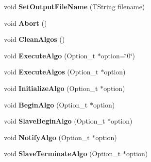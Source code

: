 \begin{DoxyCompactItemize}
\item 
\hypertarget{class_h_a_l_1_1_algorithm_ae30243bd1c0691a003d33ba6b02518cc}{void {\bfseries Set\+Output\+File\+Name} (T\+String filename)}\label{class_h_a_l_1_1_algorithm_ae30243bd1c0691a003d33ba6b02518cc}

\item 
\hypertarget{class_h_a_l_1_1_algorithm_a0b2b7e0a90824e7c2ed31fd8fc299d61}{void {\bfseries Abort} ()}\label{class_h_a_l_1_1_algorithm_a0b2b7e0a90824e7c2ed31fd8fc299d61}

\item 
\hypertarget{class_h_a_l_1_1_algorithm_a77516eeeffb62ed507616ddd006e023c}{void {\bfseries Clean\+Algos} ()}\label{class_h_a_l_1_1_algorithm_a77516eeeffb62ed507616ddd006e023c}

\item 
\hypertarget{class_h_a_l_1_1_algorithm_a64a01d69f068ef29f19057d9f4c1b172}{void {\bfseries Execute\+Algo} (Option\+\_\+t $\ast$option=\char`\"{}0\char`\"{})}\label{class_h_a_l_1_1_algorithm_a64a01d69f068ef29f19057d9f4c1b172}

\item 
\hypertarget{class_h_a_l_1_1_algorithm_aaf9d9ecdf99c327ec4de93cd5930d3c4}{void {\bfseries Execute\+Algos} (Option\+\_\+t $\ast$option)}\label{class_h_a_l_1_1_algorithm_aaf9d9ecdf99c327ec4de93cd5930d3c4}

\item 
\hypertarget{class_h_a_l_1_1_algorithm_aeb9b42850a64b3c25e7035e04c68a508}{void {\bfseries Initialize\+Algo} (Option\+\_\+t $\ast$option)}\label{class_h_a_l_1_1_algorithm_aeb9b42850a64b3c25e7035e04c68a508}

\item 
\hypertarget{class_h_a_l_1_1_algorithm_af988397097b2a83fae058744d3a909a6}{void {\bfseries Begin\+Algo} (Option\+\_\+t $\ast$option)}\label{class_h_a_l_1_1_algorithm_af988397097b2a83fae058744d3a909a6}

\item 
\hypertarget{class_h_a_l_1_1_algorithm_a82cc758128d3745ba8c91f38c4aa4d15}{void {\bfseries Slave\+Begin\+Algo} (Option\+\_\+t $\ast$option)}\label{class_h_a_l_1_1_algorithm_a82cc758128d3745ba8c91f38c4aa4d15}

\item 
\hypertarget{class_h_a_l_1_1_algorithm_a205e6c98e7b7dfca647edadaa1d159e8}{void {\bfseries Notify\+Algo} (Option\+\_\+t $\ast$option)}\label{class_h_a_l_1_1_algorithm_a205e6c98e7b7dfca647edadaa1d159e8}

\item 
\hypertarget{class_h_a_l_1_1_algorithm_ae9b629cebefe6ac8629dd6a2e66d05d6}{void {\bfseries Slave\+Terminate\+Algo} (Option\+\_\+t $\ast$option)}\label{class_h_a_l_1_1_algorithm_ae9b629cebefe6ac8629dd6a2e66d05d6}


\end{DoxyCompactItemize}
